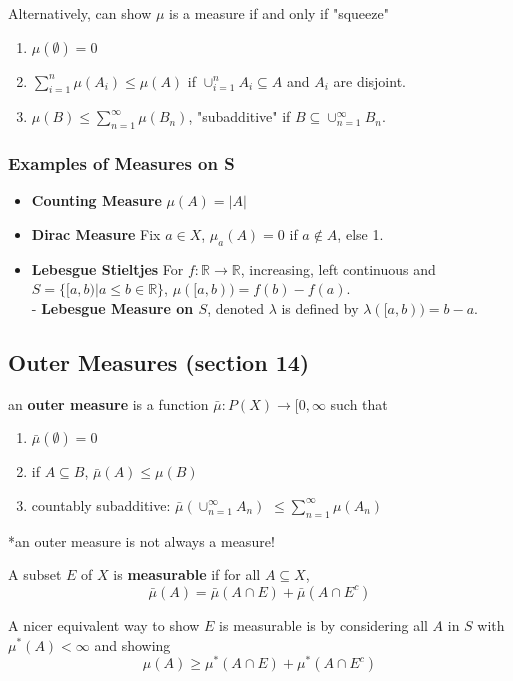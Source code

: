 \documentclass[a4paper, 12pt]{article}
\def\R{\ensuremath{\mathbb{R}}} %
\newcommand{\bt}[1]{\textbf{#1}} %
\begin{document}
\begin{multicols}{2}
Alternatively, can show $\mu$ is a measure if and only if "squeeze" 
\begin{enumerate}
    \item $\mu(\emptyset) = 0$
    \item $\sum_{i=1}^n \mu(A_i) \leq \mu(A)$ if $\cup_{i=1}^n A_i \subseteq A$ and $A_i$ are disjoint.
    \item $\mu(B) \leq \sum_{n=1}^\infty \mu(B_n)$, "subadditive"  if 
    $B \subseteq \cup_{n=1}^\infty B_n$.
\end{enumerate}

\subsubsection{Examples of Measures on S}
\begin{itemize}
    \item \bt{Counting Measure} $\mu(A) = |A|$ 
    \item \bt{Dirac Measure} Fix $a \in X$, $\mu_a(A) = 0$ if $a \not \in A$, else 1.
    \item \bt{Lebesgue Stieltjes} For $f: \R \rightarrow \R$, increasing, left continuous and
    $S = \{[a, b) | a \leq b \in \R \}$, $\mu([a, b)) = f(b) - f(a).$\\
    - \bt{Lebesgue Measure on $S$}, denoted $\lambda$ is defined by $\lambda([a, b)) = b-a.$
\end{itemize}

\subsection{Outer Measures (section 14)}

an \bt{outer measure} is a function $\bar \mu: P(X) \rightarrow [0, \infty$ such that 
\begin{enumerate}
    \item $\bar \mu(\emptyset) = 0$
    \item if $A \subseteq B$, $\bar \mu(A) \leq \mu(B)$
    \item countably subadditive: $\bar \mu( \cup_{n=1}^\infty A_n)$ 
    $\leq \sum_{n=1}^\infty \mu(A_n)$
\end{enumerate}

*an outer measure is not always a measure!

A subset $E$ of $X$ is \bt{measurable} if for all $A \subseteq X$,
$$\bar \mu(A) = \bar \mu(A \cap E) + \bar \mu(A \cap E^c)$$

A nicer equivalent way to show $E$ is measurable is by considering 
all $A$ in $S$ with $\mu^*(A) < \infty$ and showing 
$$\mu(A) \geq \mu^*(A \cap E) + \mu^*(A \cap E^c)$$


\end{multicols}
\end{document}

